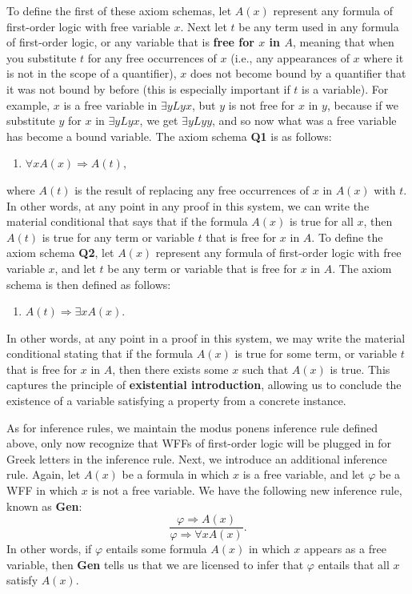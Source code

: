 \documentclass[11pt]{article}
\theoremstyle{definition}
\theoremstyle{remark}
\begin{document}
To define the first of these axiom schemas, let $A(x)$ represent any formula of first-order logic with free variable $x$. Next let $t$ be any term used in any formula of first-order logic, or any variable that is \textbf{free for $x$ in $A$}, meaning that when you substitute $t$ for any free occurrences of $x$ (i.e., any appearances of $x$ where it is not in the scope of a quantifier), $x$ does not become bound by a quantifier that it was not bound by before (this is especially important if $t$ is a variable). For example, $x$ is a free variable in $\exists y Lyx$, but $y$ is not free for $x$ in $y$, because if we substitute $y$ for $x$ in $\exists y Lyx$, we get $\exists y Lyy$, and so now what was a free variable has become a bound variable. The axiom schema \textbf{Q1} is as follows:
\begin{enumerate}
    \item[Q1.\ ]$\forall x A(x) \Rightarrow A(t)$,
\end{enumerate}
where $A(t)$ is the result of replacing any free occurrences of $x$ in $A(x)$ with $t$. In other words, at any point in any proof in this system, we can write the material conditional that says that if the formula $A(x)$ is true for all $x$, then $A(t)$ is true for any term or variable $t$ that is free for $x$ in $A$. To define the axiom schema \textbf{Q2}, let $A(x)$ represent any formula of first-order logic with free variable $x$, and let $t$ be any term or variable that is free for $x$ in $A$. The axiom schema is then defined as follows:
\begin{enumerate}
    \item[Q2.\ ]$A(t) \Rightarrow \exists x A(x)$.
\end{enumerate}
In other words, at any point in a proof in this system, we may write the material conditional stating that if the formula $A(x)$ is true for some term, or variable $t$ that is free for $x$ in $A$, then there exists some $x$ such that $A(x)$ is true. This captures the principle of \textbf{existential introduction}, allowing us to conclude the existence of a variable satisfying a property from a concrete instance.


As for inference rules, we maintain the modus ponens inference rule defined above, only now recognize that WFFs of first-order logic will be plugged in for Greek letters in the inference rule. Next, we introduce an additional inference rule. Again, let $A(x)$ be a formula in which $x$ is a free variable, and let $\varphi$ be a WFF in which $x$ is not a free variable. We have the following new inference rule, known as \textbf{Gen}:
$$\frac{\varphi\Rightarrow A(x)}{\varphi\Rightarrow \forall x A(x)}.$$
In other words, if $\varphi$ entails some formula $A(x)$ in which $x$ appears as a free variable, then \textbf{Gen} tells us that we are licensed to infer that $\varphi$ entails that all $x$ satisfy $A(x)$.\par
\end{document}
